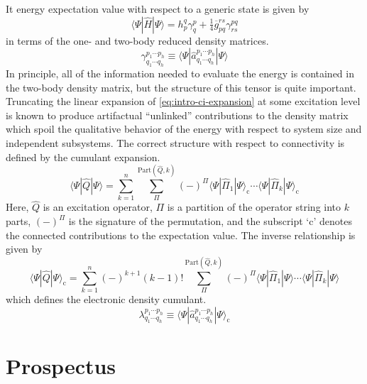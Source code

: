 It energy expectation value with respect to a generic state is given by
\begin{equation}
    \langle\Psi|
    \hat{H}
    |\Psi\rangle
    =
    h_p^q
    \gamma^p_q
    +
    \tfrac{1}{4}
    \overline{g}_{pq}^{rs}
    \gamma^{pq}_{rs}
\end{equation}
in terms of the one- and two-body reduced density matrices.
\begin{equation}
    \gamma^{p_1\cdots p_h}_{q_1\cdots q_h}
    \equiv
    \langle\Psi|\hat{a}^{p_1\cdots p_h}_{q_1\cdots q_h}|\Psi\rangle
\end{equation}
In principle, all of the information needed to evaluate the energy is contained
in the two-body density matrix, but the structure of this tensor is quite
important.
Truncating the linear expansion of \cref{eq:intro-ci-expansion} at some
excitation level is known to produce artifactual ``unlinked'' contributions to
the density matrix which spoil the qualitative behavior of the energy with
respect to system size and independent subsystems.
The correct structure with respect to connectivity is defined by the cumulant
expansion.\cite{McCullagh:1987}
\begin{equation}
    \langle\Psi|\hat{Q}|\Psi\rangle
    =
    \sum_{k=1}^n
    \sum_{\Pi}^{\mathrm{Part}(\hat{Q}, k)}
    (-)^{\Pi}
    \langle\Psi|\hat{\Pi}_1|\Psi\rangle_\mathrm{c}
    \cdots
    \langle\Psi|\hat{\Pi}_k|\Psi\rangle_\mathrm{c}
\end{equation}
Here, \(\hat{Q}\) is an excitation operator, \(\Pi\) is a partition of the
operator string into \(k\) parts, \((-)^\Pi\) is the signature of the
permutation, and the subscript `\(\mathrm{c}\)' denotes the connected
contributions to the expectation value.
The inverse relationship is given by
\begin{equation}
    \langle\Psi|\hat{Q}|\Psi\rangle_\mathrm{c}
    =
    \sum_{k=1}^n
    (-)^{k+1}
    (k-1)!
    \sum_{\Pi}^{\mathrm{Part}(\hat{Q}, k)}
    (-)^{\Pi}
    \langle\Psi|\hat{\Pi}_1|\Psi\rangle
    \cdots
    \langle\Psi|\hat{\Pi}_k|\Psi\rangle
\end{equation}
which defines the electronic density cumulant.
\begin{equation}
    \lambda^{p_1\cdots p_h}_{q_1\cdots q_h}
    \equiv
    \langle\Psi|\hat{a}^{p_1\cdots p_h}_{q_1\cdots q_h}|\Psi\rangle_\mathrm{c}
\end{equation}



\section{Prospectus}

